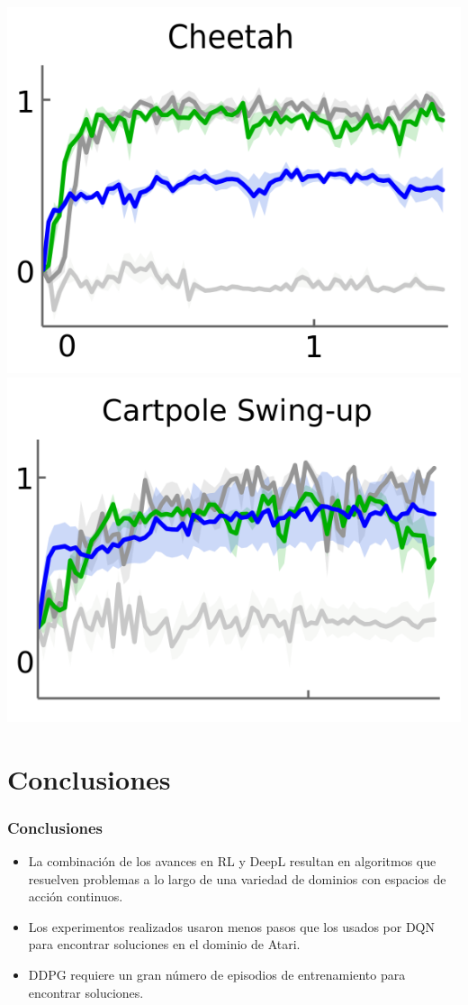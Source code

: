 \documentclass[
    11pt,
    aspectratio=169,
]{beamer}
\begin{document}
\begin{frame}
\begin{center}
\includegraphics[scale=0.2]{Images/cheetah_grafica}
\includegraphics[scale=0.2]{Images/cartpole_grafica}
\end{center}

\end{frame}

\section{Conclusiones}

\begin{frame}
\frametitle{Conclusiones}

\begin{itemize}
\item La combinación de los avances en RL y DeepL resultan en algoritmos que resuelven problemas a lo largo de una variedad de dominios con espacios de acción continuos.
\item Los experimentos realizados usaron menos pasos que los usados por DQN para encontrar soluciones en el dominio de Atari.
\item DDPG requiere un gran número de episodios de entrenamiento para encontrar soluciones.
\end{itemize}

\end{frame}
\end{document}
